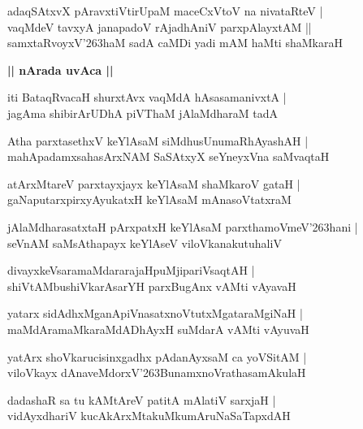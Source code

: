 \documentclass[twoside,12pt,openright]{book}
\def\S{\char'263}
\newcounter{shloka}[chapter]
\def\uvaca#1{\centerline{{\large\textbf{#1}}}}
\begin{document}
\begin{shloka}%
adaqSAtxvX pAravxtiVtirUpaM maceCxVtoV na nivataRteV |\\
vaqMdeV tavxyA janapadoV rAjadhAniV parxpAlayxtAM ||\\
samxtaRvoyxV\S haM sadA caMDi yadi mAM haMti shaMkaraH 
\end{shloka}

\uvaca{|| nArada uvAca ||}

\begin{shloka}%
iti BataqRvacaH shurxtAvx vaqMdA hAsasamanivxtA |\\
jagAma shibirArUDhA piVThaM jAlaMdharaM tadA 
\end{shloka}

\begin{shloka}%
Atha parxtasethxV keYlAsaM siMdhusUnumaRhAyashAH |\\
mahApadamxsahasArxNAM SaSAtxyX seYneyxVna saMvaqtaH 
\end{shloka}

\begin{shloka}%
atArxMtareV parxtayxjayx keYlAsaM shaMkaroV gataH |\\
gaNaputarxpirxyAyukatxH keYlAsaM mAnasoVtatxraM 
\end{shloka}

\begin{shloka}%
jAlaMdharasatxtaH pArxpatxH keYlAsaM  parxthamoVmeV\S hani |\\
seVnAM saMsAthapayx keYlAseV viloVkanakutuhaliV 
\end{shloka}

\begin{shloka}%
divayxkeVsaramaMdararajaHpuMjipariVsaqtAH |\\
shiVtAMbushiVkarAsarYH parxBugAnx vAMti vAyavaH 
\end{shloka}

\begin{shloka}%
yatarx sidAdhxMganApiVnasatxnoVtutxMgataraMgiNaH |\\
maMdAramaMkaraMdADhAyxH suMdarA vAMti vAyuvaH 
\end{shloka}

\begin{shloka}%
yatArx shoVkarucisinxgadhx pAdanAyxsaM ca yoVSitAM |\\
viloVkayx dAnaveMdorxV\S BunamxnoVrathasamAkulaH 
\end{shloka}

\begin{shloka}%
dadashaR sa tu kAMtAreV patitA mAlatiV sarxjaH |\\
vidAyxdhariV kucAkArxMtakuMkumAruNaSaTapxdAH 
\end{shloka}
\end{document}

